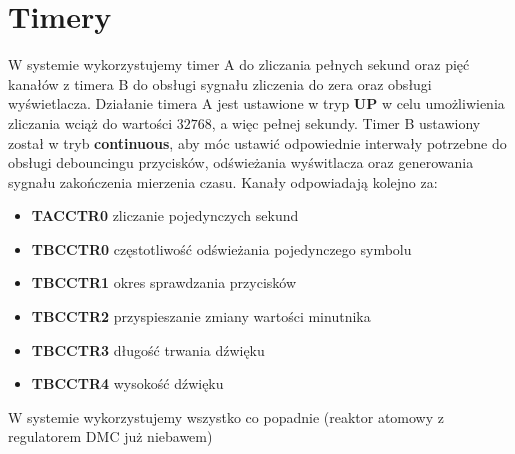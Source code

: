 \documentclass[fleqn]{article}
\begin{document}
\section{Timery}

W systemie wykorzystujemy timer A do zliczania pełnych sekund oraz pięć kanałów z timera B do obsługi sygnału zliczenia do zera oraz obsługi wyświetlacza. Działanie timera A jest ustawione w tryp \textbf{UP} w celu umożliwienia zliczania wciąż do wartości $32768$, a więc pełnej sekundy. Timer B ustawiony został w tryb \textbf{continuous}, aby móc ustawić odpowiednie interwały potrzebne do obsługi debouncingu przycisków, odświeżania wyświtlacza oraz generowania sygnału zakończenia mierzenia czasu. Kanały odpowiadają kolejno za:
\begin{itemize}
	\item  \textbf{TACCTR0} zliczanie pojedynczych sekund
	\item  \textbf{TBCCTR0} częstotliwość odświeżania pojedynczego symbolu
	\item  \textbf{TBCCTR1} okres sprawdzania przycisków
	\item  \textbf{TBCCTR2} przyspieszanie zmiany wartości minutnika
	\item  \textbf{TBCCTR3} długość trwania dźwięku
	\item  \textbf{TBCCTR4} wysokość dźwięku
\end{itemize}

W systemie wykorzystujemy wszystko co popadnie (reaktor atomowy z regulatorem DMC już niebawem)
\end{document}

